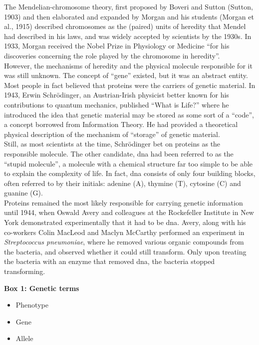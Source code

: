 The Mendelian-chromosome theory, first proposed by Boveri and Sutton (Sutton, 1903) and then elaborated and expanded by Morgan and his students (Morgan et al., 1915) described chromosomes as the (paired) units of heredity that Mendel had described in his laws, and was widely accepted by scientists by the 1930s. 
In 1933, Morgan received the Nobel Prize in Physiology or Medicine “for his discoveries concerning the role played by the chromosome in heredity”.\\

However, the mechanisms of heredity and the physical molecule responsible for it was still unknown. 
The concept of “gene” existed, but it was an abstract entity. 
Most people in fact believed that proteins were the carriers of genetic material. 
In 1943, Erwin  Schrödinger, an Austrian-Irish physicist better known for his contributions to quantum mechanics, published “What is Life?” where he introduced the idea that genetic material may be stored as some sort of a “code”, a concept borrowed from Information Theory. 
He had provided a theoretical physical description of the mechanism of “storage” of genetic material.\\ 

Still, as most scientists at the time, Schrödinger bet on proteins as the responsible molecule. 
The other candidate, \gls{dna} had been referred to as the “stupid molecule”, a molecule with a chemical structure far too simple to be able to explain the complexity of life. 
In fact, \gls{dna} consists of only four building blocks, often referred to by their initials: adenine (A), thymine (T), cytosine (C) and guanine (G).\\

Proteins remained the most likely responsible for carrying genetic information until 1944, when Oswald Avery and colleagues at the Rockefeller Institute in New York demonstrated experimentally that it had to be \gls{dna}. 
Avery, along with his co-workers Colin MacLeod and Maclyn McCarthy performed an experiment in \textit{Streptococcus pneumoniae}, where he removed various organic compounds from the bacteria, and observed whether it could still transform. 
Only upon treating the bacteria with an enzyme that removed \gls{dna}, the bacteria stopped transforming.


\begin{Comment}
\hspace{-2.5mm}\textbf{Box 1: Genetic terms}\label{box1}
\begin{itemize}
    \item Phenotype
    \item Gene
    \item Allele

\end{itemize}


\end{Comment}


